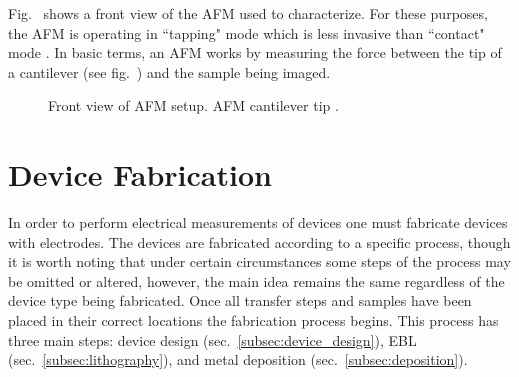 \noindent Fig.~ shows a front view of the \acs{AFM} used to characterize. For these purposes, the \acs{AFM} is operating in ``tapping" mode which is less invasive than ``contact" mode \cite{Kittel_IntroSolidState2005}. In basic terms, an \acs{AFM} works by measuring the force between the tip of a cantilever (see fig.~) and the sample being imaged. 
\begin{figure}[ht]
	\centering
	\qquad
	\caption[AFM setup and AFM cantilever]{\protect{} Front view of \acs{AFM} setup. \protect{} AFM cantilever tip \cite{Ernst-Moritz-Arndt_Online}.}
\end{figure}

\section{Device Fabrication}\label{sec:device_fabrication}
In order to perform electrical measurements of devices one must fabricate devices with electrodes. The devices are fabricated according to a specific process, though it is worth noting that under certain circumstances some steps of the process may be omitted or altered, however, the main idea remains the same regardless of the device type being fabricated. Once all transfer steps and samples have been placed in their correct locations the fabrication process begins. This process has three main steps: device design (sec.~\ref{subsec:device_design}), \ac{EBL} (sec.~\ref{subsec:lithography}), and metal deposition (sec.~\ref{subsec:deposition}).

